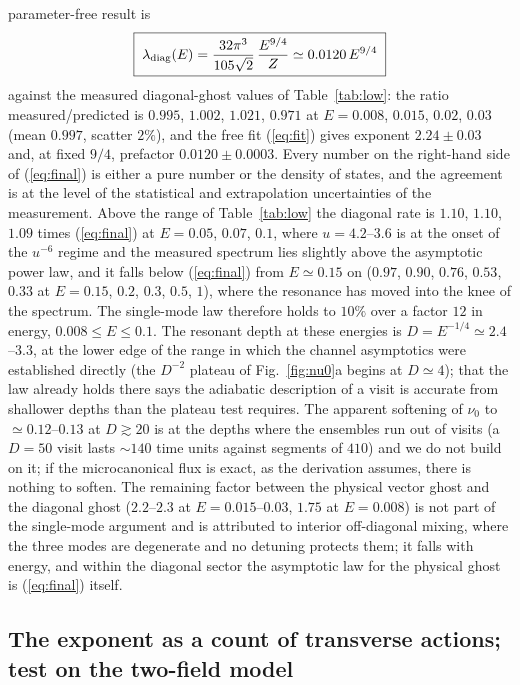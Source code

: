 \documentclass[11pt,a4paper]{article}
\begin{document}
parameter-free result is
\begin{equation}
\boxed{\;\lambda_{\rm diag}(E)=\frac{32\pi^3}{105\sqrt2}\,\frac{E^{9/4}}{Z}\simeq0.0120\,E^{9/4}\;}
\label{eq:final}
\end{equation}
against the measured diagonal-ghost values of Table~\ref{tab:low}: the ratio
measured/predicted is $0.995$, $1.002$, $1.021$, $0.971$ at $E=0.008$, $0.015$, $0.02$, $0.03$
(mean $0.997$, scatter $2\%$), and the free fit (\ref{eq:fit}) gives exponent $2.24\pm0.03$ and,
at fixed $9/4$, prefactor $0.0120\pm0.0003$. Every number on the right-hand side of
(\ref{eq:final}) is either a pure number or the density of states, and the agreement is at the
level of the statistical and extrapolation uncertainties of the measurement. Above the range of
Table~\ref{tab:low} the diagonal rate is $1.10$, $1.10$, $1.09$ times (\ref{eq:final}) at
$E=0.05$, $0.07$, $0.1$, where $u=4.2$--$3.6$ is at the onset of the $u^{-6}$ regime and the
measured spectrum lies slightly above the asymptotic power law, and it falls below
(\ref{eq:final}) from $E\simeq0.15$ on ($0.97$, $0.90$, $0.76$, $0.53$, $0.33$ at $E=0.15$,
$0.2$, $0.3$, $0.5$, $1$), where the resonance has moved into the knee of the spectrum. The
single-mode law therefore holds to $10\%$ over a factor $12$ in energy, $0.008\le E\le0.1$. The resonant depth
at these energies is $D=E^{-1/4}\simeq2.4$--$3.3$, at the lower edge of the range in which the
channel asymptotics were established directly (the $D^{-2}$ plateau of Fig.~\ref{fig:nu0}a
begins at $D\simeq4$); that the law already holds there says the adiabatic description of a visit
is accurate from shallower depths than the plateau test requires. The apparent softening of
$\nu_0$ to $\simeq0.12$--$0.13$ at $D\gtrsim20$ is at the depths where the ensembles run out of
visits (a $D=50$ visit lasts $\sim140$ time units against segments of $410$) and we do not build
on it; if the microcanonical flux is exact, as the derivation assumes, there is nothing to
soften. The remaining factor between the physical vector ghost and the diagonal ghost
($2.2$--$2.3$ at $E=0.015$--$0.03$, $1.75$ at $E=0.008$) is not part of the single-mode argument
and is attributed to interior off-diagonal mixing, where the three modes are degenerate and no
detuning protects them; it falls with energy, and within the diagonal sector the asymptotic law
for the physical ghost is (\ref{eq:final}) itself.

\subsection{The exponent as a count of transverse actions; test on the two-field model}
\label{sec:twofield}
\end{document}
